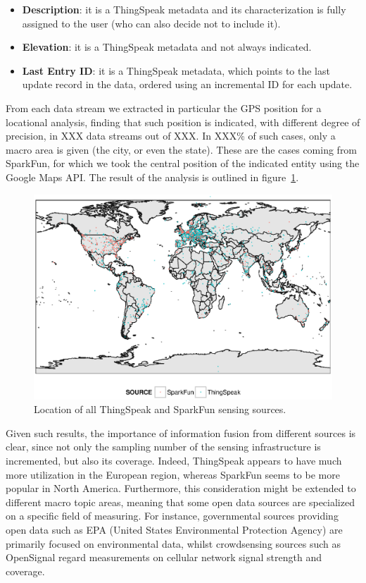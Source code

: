 \begin{itemize}
 \item \textbf{Description}: it is a ThingSpeak metadata and its characterization is fully assigned to the user (who can also decide not to include it).
 \item \textbf{Elevation}: it is a ThingSpeak metadata and not always indicated.
 \item \textbf{Last Entry ID}: it is a ThingSpeak metadata, which points to the last update record in the data, ordered using an incremental ID for each update.
\end{itemize}

From each data stream we extracted in particular the GPS position for a locational analysis, finding that such position is indicated, with different degree of precision, in XXX data streams out of XXX.
In XXX\% of such cases, only a macro area is given (the city, or even the state).
These are the cases coming from SparkFun, for which we took the central position of the indicated entity using the Google Maps API.
The result of the analysis is outlined in figure~\ref{geo}.

\begin{figure}[!t]
\centering
\includegraphics[width=1\textwidth]{img/map.eps} 
\caption{Location of all ThingSpeak and SparkFun sensing sources.}
\label{geo}
\end{figure}

Given such results, the importance of information fusion from different sources is clear, since not only the sampling number of the sensing infrastructure is incremented, but also its coverage.
Indeed, ThingSpeak appears to have much more utilization in the European region, whereas SparkFun seems to be more popular in North America.
Furthermore, this consideration might be extended to different macro topic areas, meaning that some open data sources are specialized on a specific field of measuring.
For instance, governmental sources providing open data such as EPA (United States Environmental Protection Agency) \cite{epa} are primarily focused on environmental data, whilst crowdsensing sources such as OpenSignal \cite{opensignal} regard measurements on cellular network signal strength and coverage.
\\

